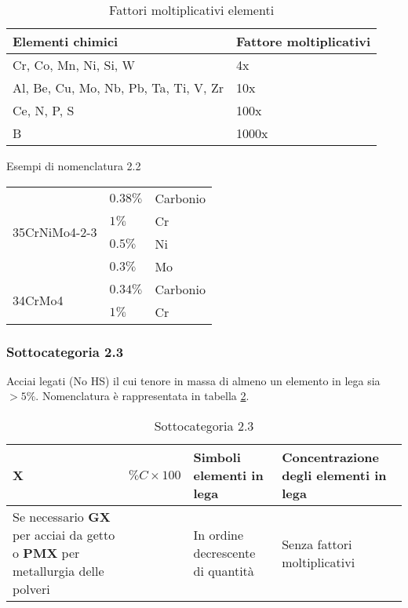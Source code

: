 \begin{table}
\centering
\caption{Fattori moltiplicativi elementi}\label{tab:FattoriElementi}
\begin{tabularx}{\textwidth}{XX}
\toprule
\textbf{Elementi chimici} & \textbf{Fattore moltiplicativi}\\
\midrule
Cr, Co, Mn, Ni, Si, W & 4x\\
\midrule
Al, Be, Cu, Mo, Nb, Pb, Ta, Ti, V, Zr & 10x\\
\midrule
Ce, N, P, S & 100x\\
\midrule
B & 1000x\\
\bottomrule
\end{tabularx}
\end{table}

\begin{example}{Esempi di nomenclatura 2.2}
\begin{tabularx}{\textwidth}{XXX}
\multirow{4}{*}{35CrNiMo4-2-3} & $0.38\%$ & Carbonio\\
	& $1\%$ & Cr\\
	& $0.5\%$ & Ni\\
	& $0.3\%$ & Mo\\
\midrule
\multirow{2}{*}{34CrMo4} & $0.34\%$ & Carbonio\\
	& $1\%$ & Cr\\
\bottomrule
\end{tabularx}
\end{example}

\subsubsection{Sottocategoria 2.3}\label{sssc:Sottogruppo2.3}
Acciai legati (No HS) il cui tenore in massa di almeno un elemento in lega sia $>5\%$.
Nomenclatura è rappresentata in tabella \ref{tab:Sotto3}.

\begin{table}
\centering
\caption{Sottocategoria 2.3}\label{tab:Sotto3}
\begin{tabularx}{\textwidth}{|X|X|X|X|}
\textbf{X} & \textbf{$\%C \times 100$} & \textbf{Simboli elementi in lega} & \textbf{Concentrazione degli elementi in lega}\\
\midrule
Se necessario \textbf{GX} per acciai da getto o \textbf{PMX} per metallurgia delle polveri &&
In ordine decrescente di quantità &
Senza fattori moltiplicativi\\
\end{tabularx}
\end{table}

